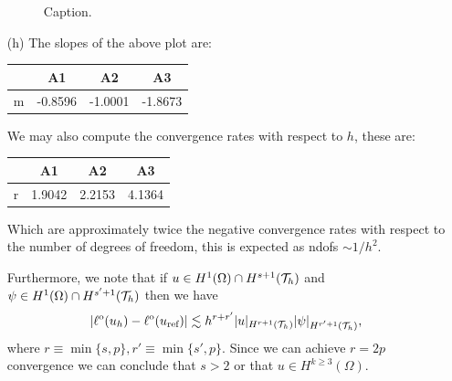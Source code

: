 \documentclass{article}
\begin{document}
\begin{itemize}
\begin{figure}[H]
		\caption{Caption.}
		\label{out_err_conv}
	\end{figure}
	\item[(h)] The slopes of the above plot are:\\
		\begin{table}[H]
			\centering
			\begin{tabular}{r||c|c|c}
				& A1 & A2 & A3 \\
				\hline
				m & -0.8596 & -1.0001 & -1.8673\\
			\end{tabular}
		\end{table}
		We may also compute the convergence rates with respect to \(h\), these are:\\
		\begin{table}[H]
			\centering
			\begin{tabular}{r||c|c|c}
				& A1 & A2 & A3 \\
				\hline
				r & 1.9042 & 2.2153 & 4.1364\\
			\end{tabular}
		\end{table}
		
		Which are approximately twice the negative convergence rates with respect to the number of degrees of freedom, this is expected as ndofs \(\sim 1/h^2 \).
		
		Furthermore, we note that if \(u \in H^1(\Omega) \cap H^{s+1}(\mathcal{T}_h) \) and \(\psi \in H^1(\Omega) \cap H^{s'+1}(\mathcal{T}_h) \) then we have
		\begin{equation*}
			|\ell^\text{o}(u_h) - \ell^\text{o}(u_\text{ref})| \lesssim h^{r+r'}|u|_{H^{r+1}(\mathcal{T}_h)}|\psi|_{H^{r'+1}(\mathcal{T}_h)},
		\end{equation*}
		where \(r \equiv \min\{s,p\}, r' \equiv \min\{s',p\} \). Since we can achieve \(r=2p\) convergence we can conclude that \(s > 2\) or that \(u \in H^{k\geq3}(\Omega) \).
		
\end{itemize}
\end{document}
